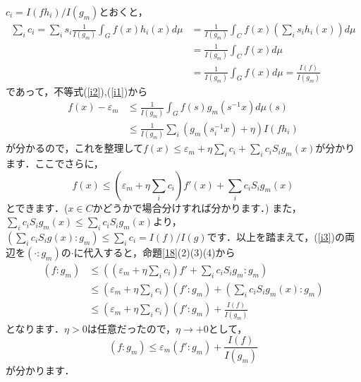 \begin{Proof}
$c_i=I(fh_i)/I(g_{m})$とおくと，
\begin{align*}
\sum_{i}c_{i}=\sum_{i}s_{i}  \frac{1}{I(g_{m})} \int_{G}f(x)h_{i}(x)d\mu & = \frac{1}{I(g_{m})}\int_{C}f(x) \left( \sum_{i}s_{i}h_{i}(x) \right) d\mu \\
 & =\frac{1}{I(g_{m})}\int_{C}f(x) d\mu \\
 & =\frac{1}{I(g_{m})}\int_{G}f(x) d\mu=\frac{I(f)}{I(g_{m})}
\end{align*}
であって，不等式(\ref{i2}),(\ref{i1})から
\begin{align*}
f(x)-\varepsilon_{m} & \le \frac{1}{I(g_{m})} \int_{G}f(s)g_{m}(s^{-1}x)d\mu(s) \\ 
 & \le \frac{1}{I(g_{m})} \sum_{i}\left( g_{m}(s_{i}^{-1}x) + \eta \right)I(fh_{i})
\end{align*}
が分かるので，これを整理して$f(x) \le \varepsilon_{m} + \eta \sum_{i}c_{i} + \sum_{i}c_{i}S_{i}g_{m}(x)$が分かります．ここでさらに，
\begin{equation}
f(x) \le \left( \varepsilon_{m} + \eta \sum_{i}c_{i} \right)f'(x) + \sum_{i}c_{i}S_{i}g_{m}(x)
\label{i3}
\end{equation}
とできます．($x \in C$かどうかで場合分けすれば分かります．) また，$\sum_{i}c_{i}S_{i}g_{m}(x) \le \sum_{i}c_{i}S_{i}g_{m}(x)$より， $\left( \sum_{i}c_{i}S_{i}g(x) \colon g_{m} \right) \le \sum_{i}c_{i}=I(f)/I(g)$です．以上を踏まえて，(\ref{i3})の両辺を$\left( \cdot \colon g_{m} \right) $の$\cdot$に代入すると，命題\ref{18}(2)(3)(4)から 
\begin{align*}
\left( f \colon g_{m} \right) & \le \left( \left( \varepsilon_{m} + \eta \sum_{i}c_{i} \right)f' +  \sum_{i}c_{i}S_{i}g_{m} \colon g_{m} \right) \\
 & \le \left( \varepsilon_{m} + \eta \sum_{i}c_{i} \right) \left( f' \colon g_{m} \right) + \left( \sum_{i}c_{i}S_{i}g_{m}(x) \colon g_{m} \right) \\
 & \le \left( \varepsilon_{m} + \eta \sum_{i}c_{i} \right) \left( f' \colon g_{m} \right) + \frac{I(f)}{I(g_{m})}
\end{align*}
となります．$\eta>0$は任意だったので，$\eta \to +0$として，
\begin{equation}
\left( f \colon g_{m} \right) \le \varepsilon_{m} \left( f' \colon g_{m} \right) + \frac{I(f)}{I(g_{m})}
\label{i4}
\end{equation}
が分かります．


\end{Proof}
